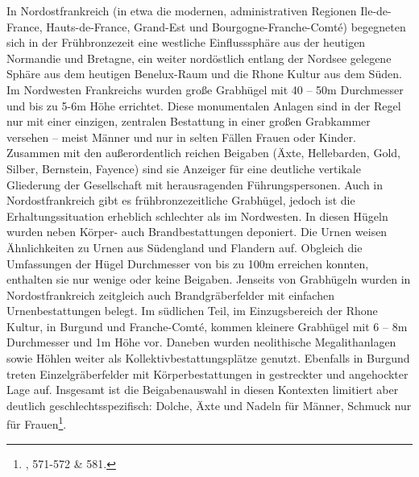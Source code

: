 \documentclass[openany,twoside,twocolumn]{book}
\let\rmarkdownfootnote\footnote%
\def\footnote{\protect\rmarkdownfootnote}
\begin{document}
In Nordostfrankreich (in etwa die modernen, administrativen Regionen Ile-de-France, Hauts-de-France, Grand-Est und Bourgogne-Franche-Comté) begegneten sich in der Frühbronzezeit eine westliche Einflusssphäre aus der heutigen Normandie und Bretagne, ein weiter nordöstlich entlang der Nordsee gelegene Sphäre aus dem heutigen Benelux-Raum und die Rhone Kultur aus dem Süden. Im Nordwesten Frankreichs wurden große Grabhügel mit 40 -- 50m Durchmesser und bis zu 5-6m Höhe errichtet. Diese monumentalen Anlagen sind in der Regel nur mit einer einzigen, zentralen Bestattung in einer großen Grabkammer versehen -- meist Männer und nur in selten Fällen Frauen oder Kinder. Zusammen mit den außerordentlich reichen Beigaben (Äxte, Hellebarden, Gold, Silber, Bernstein, Fayence) sind sie Anzeiger für eine deutliche vertikale Gliederung der Gesellschaft mit herausragenden Führungspersonen. Auch in Nordostfrankreich gibt es frühbronzezeitliche Grabhügel, jedoch ist die Erhaltungssituation erheblich schlechter als im Nordwesten. In diesen Hügeln wurden neben Körper- auch Brandbestattungen deponiert. Die Urnen weisen Ähnlichkeiten zu Urnen aus Südengland und Flandern auf. Obgleich die Umfassungen der Hügel Durchmesser von bis zu 100m erreichen konnten, enthalten sie nur wenige oder keine Beigaben. Jenseits von Grabhügeln wurden in Nordostfrankreich zeitgleich auch Brandgräberfelder mit einfachen Urnenbestattungen belegt. Im südlichen Teil, im Einzugsbereich der Rhone Kultur, in Burgund und Franche-Comté, kommen kleinere Grabhügel mit 6 -- 8m Durchmesser und 1m Höhe vor. Daneben wurden neolithische Megalithanlagen sowie Höhlen weiter als Kollektivbestattungsplätze genutzt. Ebenfalls in Burgund treten Einzelgräberfelder mit Körperbestattungen in gestreckter und angehockter Lage auf. Insgesamt ist die Beigabenauswahl in diesen Kontexten limitiert aber deutlich geschlechtsspezifisch: Dolche, Äxte und Nadeln für Männer, Schmuck nur für Frauen\footnote{\textcite{mordant_bronze_2013}, 571-572 \& 581.}.
\end{document}
